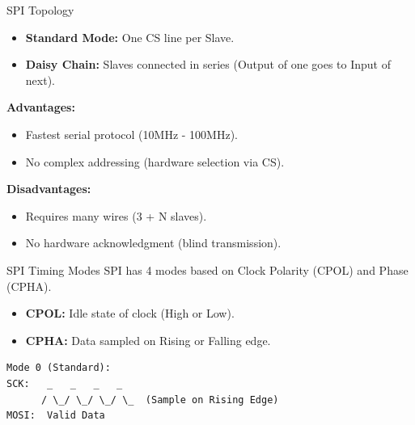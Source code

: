 \begin{frame}{SPI Topology}

\begin{itemize}
    \item \textbf{Standard Mode:} One CS line per Slave.
    \item \textbf{Daisy Chain:} Slaves connected in series (Output of one goes to Input of next).
\end{itemize}

\textbf{Advantages:}
\begin{itemize}
    \item Fastest serial protocol (10MHz - 100MHz).
    \item No complex addressing (hardware selection via CS).
\end{itemize}
\textbf{Disadvantages:}
\begin{itemize}
    \item Requires many wires (3 + N slaves).
    \item No hardware acknowledgment (blind transmission).
\end{itemize}
\end{frame}

\begin{frame}[fragile]{SPI Timing Modes}
SPI has 4 modes based on Clock Polarity (CPOL) and Phase (CPHA).
\begin{itemize}
    \item \textbf{CPOL:} Idle state of clock (High or Low).
    \item \textbf{CPHA:} Data sampled on Rising or Falling edge.
\end{itemize}

\begin{verbatim}
Mode 0 (Standard):
SCK:   _   _   _   _
      / \_/ \_/ \_/ \_  (Sample on Rising Edge)
MOSI:  Valid Data
\end{verbatim}
\end{frame}

